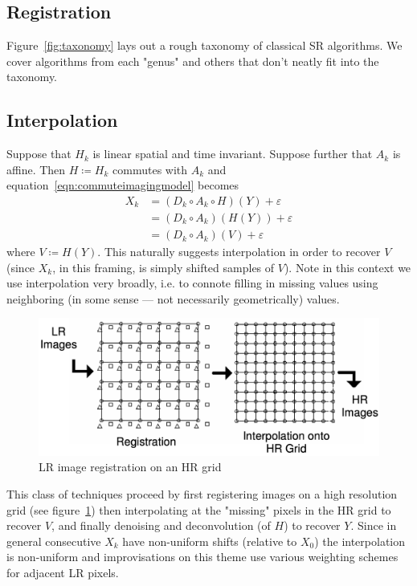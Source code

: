 \subsection{Registration}

Figure~\ref{fig:taxonomy} lays out a rough taxonomy of classical SR algorithms.
%
We cover algorithms from each "genus" and others that don't neatly fit into the taxonomy.
\subsection{Interpolation}
Suppose that $H_k$ is linear spatial and time invariant.
%
Suppose further that $A_k$ is affine.
%
Then $H \coloneqq H_k$ commutes with $A_k$\cite{meladcommute} and equation~\ref{eqn:commuteimagingmodel} becomes
\begin{equation}
    \label{eqn:commuteimagingmodel}
    \begin{split}
        X_k &= (D_k \circ A_k \circ H) (Y) + \varepsilon \\
        &= (D_k \circ A_k) (H(Y)) + \varepsilon \\
        &= (D_k \circ A_k) (V) + \varepsilon
    \end{split}
\end{equation}
%
where $V \coloneqq H(Y)$.
%
This naturally suggests interpolation in order to recover $V$ (since $X_k$, in this framing, is simply shifted samples of $V$).
%
Note in this context we use interpolation very broadly, i.e. to connote filling in missing values using neighboring (in some sense --- not necessarily geometrically) values.
%
\begin{figure}
    \centering
    \includegraphics[width=\linewidth]{figures/hrgrid.png}
    \caption{LR image registration on an HR grid\cite{Lin}}
    \label{fig:hrgrid}
\end{figure}
This class of techniques proceed by first registering images on a high resolution grid (see figure~\ref{fig:hrgrid}) then interpolating at the "missing" pixels in the HR grid to recover $V$, and finally denoising and deconvolution (of $H$) to recover $Y$.
%
Since in general consecutive $X_k$ have non-uniform shifts (relative to $X_0$) the interpolation is non-uniform and improvisations on this theme use various weighting schemes for adjacent LR pixels.

